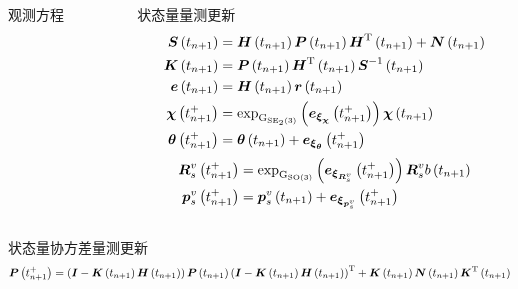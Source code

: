 \begin{frame}
\begin{columns}[t]
\begin{column}{0.5\textwidth}
\begin{block}{观测方程}
{{{					}
		   		}}
			\end{block}
		\end{column}   
		\begin{column}{0.5\textwidth}
			\begin{block}{状态量量测更新}
			\vspace{-0.5cm}
			{
				\tiny	
				\begin{align*}
			    	\vb*{S}\left(t_{n+1}\right) &= \vb*{H}\left(t_{n+1}\right) \vb*{P}\left(t_{n+1}\right) \vb*{H}^{\mathrm{T}}\left(t_{n+1}\right) + \vb*{N}\left(t_{n+1}\right) \\
			    	\vb*{K}\left(t_{n+1}\right) &= \vb*{P}\left(t_{n+1}\right) \vb*{H}^{\mathrm{T}}\left(t_{n+1}\right) \vb*{S}^{-1}\left(t_{n+1}\right) \\
				    \vb*{e}\left(t_{n+1}\right) &= \vb*{H}\left(t_{n+1}\right) \vb*{r}\left(t_{n+1}\right) \\
					\vb*{\chi}\left(t_{n+1}^+\right)   &= \exp_{\mathrm{G}_{\mathrm{SE}_2\left(3\right)}}\left( \vb*{e}_{\vb*{\xi}_{\vb*{\chi}}}\left(t_{n+1}^+\right) \right) \vb*{\chi}\left(t_{n+1}\right)\\
					\vb*{\theta}\left(t_{n+1}^+\right) &= \vb*{\theta}\left(t_{n+1}\right) + \vb*{e}_{\vb*{\xi}_{\vb*{\theta}}}\left(t_{n+1}^+\right)
				\end{align*}
			}
			\vspace{-1.0cm}
			{
				\scriptsize	
				\begin{align*}
					\vb*{R}_s^v\left(t_{n+1}^+\right)  &= \exp_{\mathrm{G}_{\mathrm{SO}\left(3\right)}}\left( \vb*{e}_{\vb*{\xi}_{\vb*{R}_s^v}}\left(t_{n+1}^+\right) \right) \vb*{R}_s^vb\left(t_{n+1}\right) \\
					\vb*{p}_s^v\left(t_{n+1}^+\right)  &= \vb*{p}_s^v\left(t_{n+1}\right) + \vb*{e}_{\vb*{\xi}_{\vb*{p}_s^v}}\left(t_{n+1}^+\right)
				\end{align*}
			}
			\end{block} 
		\end{column}
	\end{columns} 
	\begin{block}{状态量协方差量测更新}
		{\scriptsize%
			\begin{equation*}
				\vb*{P}\left(t_{n+1}^+\right) = \left(\vb*{I} - \vb*{K}\left(t_{n+1}\right)\vb*{H}\left(t_{n+1}\right)\right) \vb*{P}\left(t_{n+1}\right) \left(\vb*{I} - \vb*{K}\left(t_{n+1}\right)\vb*{H}\left(t_{n+1}\right)\right)^{\mathrm{T}} + \vb*{K}\left(t_{n+1}\right)\vb*{N}\left(t_{n+1}\right) \vb*{K}^{\mathrm{T}}\left(t_{n+1}\right)
			\end{equation*}
		}
	\end{block} 	
\end{frame}

